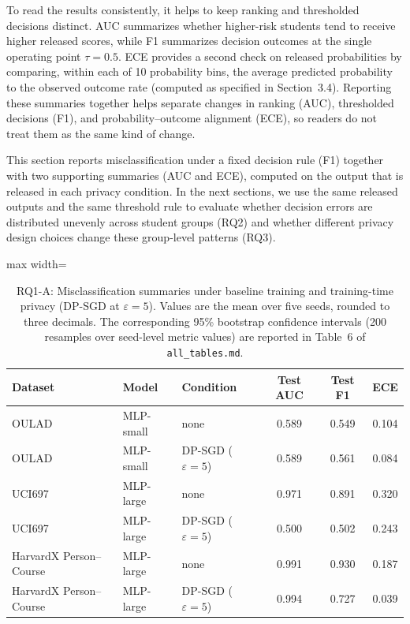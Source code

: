 \documentclass{edm_article}
\begin{document}
To read the results consistently, it helps to keep ranking and thresholded decisions distinct. AUC summarizes whether higher-risk students tend to receive higher released scores, while F1 summarizes decision outcomes at the single operating point $\tau=0.5$. ECE provides a second check on released probabilities by comparing, within each of 10 probability bins, the average predicted probability to the observed outcome rate (computed as specified in Section~3.4). Reporting these summaries together helps separate changes in ranking (AUC), thresholded decisions (F1), and probability--outcome alignment (ECE), so readers do not treat them as the same kind of change.

This section reports misclassification under a fixed decision rule (F1) together with two supporting summaries (AUC and ECE), computed on the output that is released in each privacy condition. In the next sections, we use the same released outputs and the same threshold rule to evaluate whether decision errors are distributed unevenly across student groups (RQ2) and whether different privacy design choices change these group-level patterns (RQ3).

\begin{table}[t]
\centering
\caption{RQ1-A: Misclassification summaries under baseline training and training-time privacy (DP-SGD at $\varepsilon=5$). Values are the mean over five seeds, rounded to three decimals. The corresponding 95\% bootstrap confidence intervals (200 resamples over seed-level metric values) are reported in Table~6 of \texttt{all\_tables.md}.}
\label{tab:rq1_main}
\begin{adjustbox}{max width=\linewidth}
\begin{tabular}{@{}lllccc@{}}
\toprule
Dataset & Model & Condition & Test AUC & Test F1 & ECE \\
\midrule
OULAD & MLP-small & none & 0.589 & 0.549 & 0.104 \\
OULAD & MLP-small & DP-SGD ($\varepsilon=5$) & 0.589 & 0.561 & 0.084 \\
\midrule
UCI697 & MLP-large & none & 0.971 & 0.891 & 0.320 \\
UCI697 & MLP-large & DP-SGD ($\varepsilon=5$) & 0.500 & 0.502 & 0.243 \\
\midrule
HarvardX Person--Course & MLP-large & none & 0.991 & 0.930 & 0.187 \\
HarvardX Person--Course & MLP-large & DP-SGD ($\varepsilon=5$) & 0.994 & 0.727 & 0.039 \\
\bottomrule
\end{tabular}
\end{adjustbox}
\end{table}
\end{document}
